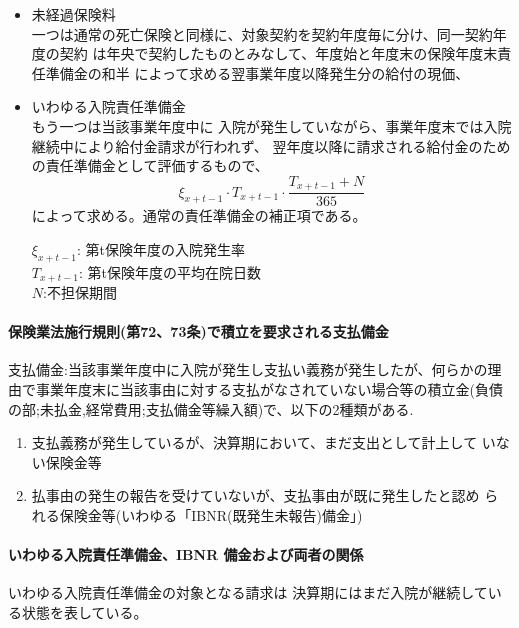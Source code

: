 \documentclass[report,gutter=10mm,fore-edge=10mm,uplatex,dvipdfmx]{jlreq}
\begin{document}
\begin{itemize}
 \item 未経過保険料\\
一つは通常の死亡保険と同様に、対象契約を契約年度毎に分け、同一契約年度の契約
は年央で契約したものとみなして、年度始と年度末の保険年度末責任準備金の和半
によって求める翌事業年度以降発生分の給付の現価、
 \item いわゆる入院責任準備金\\
もう一つは当該事業年度中に
入院が発生していながら、事業年度末では入院継続中により給付金請求が行われず、
翌年度以降に請求される給付金のための責任準備金として評価するもので、
$$\xi_{x+t-1}\cdot T_{x+t-1}\cdot\frac{T_{x+t-1}+N}{365}$$
によって求める。通常の責任準備金の補正項である。

$\xi_{x+t-1}$: 第t保険年度の入院発生率\\
$T_{x+t-1}$: 第t保険年度の平均在院日数\\
$N$:不担保期間
\end{itemize}

\paragraph{保険業法施行規則(第72、73条)で積立を要求される支払備金}

支払備金:当該事業年度中に入院が発生し支払い義務が発生したが、何らかの理由で事業年度末に当該事由に対する支払がなされていない場合等の積立金(負債の部;未払金,経常費用;支払備金等繰入額)で、以下の2種類がある. 

\begin{enumerate}
\item 支払義務が発生しているが、決算期において、まだ支出として計上して
いない保険金等
\item 払事由の発生の報告を受けていないが、支払事由が既に発生したと認め
られる保険金等(いわゆる「IBNR(既発生未報告)備金」)
\end{enumerate}

\paragraph{いわゆる入院責任準備金、IBNR 備金および両者の関係}

いわゆる入院責任準備金の対象となる請求は
決算期にはまだ入院が継続している状態を表している。
\end{document}
